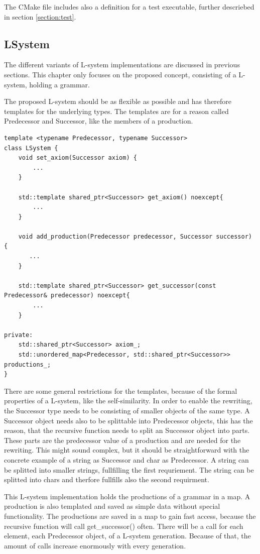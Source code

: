 \documentclass[english]{cpp-hmwk}
\begin{document}
The CMake file includes also a definition for a test executable, further descriebed in section \ref{section:test}.

\subsection{LSystem}
\label{section:impl_l_system}
The different variants of L-system implementations are discussed in previous sections. This chapter only focuses on the proposed concept, consisting of a L-system, holding a grammar.

The proposed L-system should be as flexible as possible and has therefore templates for the underlying types. The templates are for a reason called Predecessor and Successor, like the members of a production.

\medskip
\begin{lstlisting}
template <typename Predecessor, typename Successor>
class LSystem {
    void set_axiom(Successor axiom) {
        ...
    }

    std::template shared_ptr<Successor> get_axiom() noexcept{
        ...
    }

    void add_production(Predecessor predecessor, Successor successor) {
       ...
    }

    std::template shared_ptr<Successor> get_successor(const Predecessor& predecessor) noexcept{
        ...
    }
    
private:
    std::shared_ptr<Successor> axiom_;
    std::unordered_map<Predecessor, std::shared_ptr<Successor>> productions_;
}
\end{lstlisting}

\noindent There are some general restrictions for the templates, because of the formal properties of a L-system, like the self-similarity. In order to enable the rewriting, the Successor type needs to be consisting of smaller objects of the same type. A Successor object needs also to be splittable into Predecessor objects, this has the reason, that the recursive function needs to split an Successor object into parts. These parts are the predecessor value of a production and are needed for the rewriting.
This might sound complex, but  it should be straightforward with the concrete example of a string as Successor and char as Predecessor. A string can be splitted into smaller strings, fullfilling the first requriement. The string can be splitted into chars and therfore fullfills also the second requirment.

This L-system implementation holds the productions of a grammar in a map. A production is also templated and saved as simple data without special functionality. The productions are saved in a map to gain fast access, because the recursive function will call get\_successor() often. There will be a call for each element, each Predecessor object, of a L-system generation. Because of that, the amount of calls increase enormously with every generation.
\end{document}
